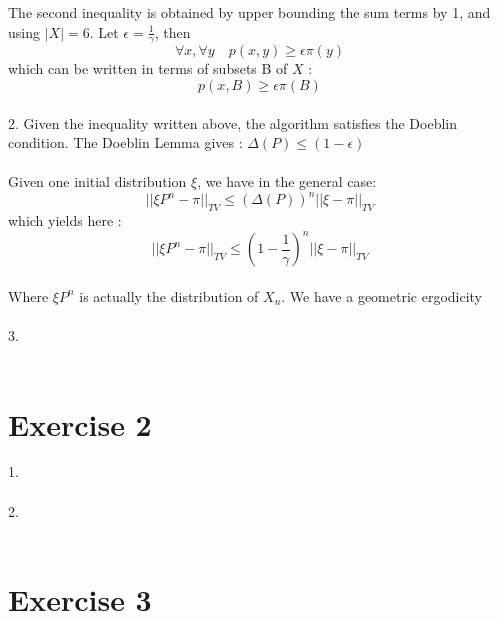 The second inequality is obtained by upper bounding the sum terms by 1, and using $|X|=6$.
Let $\boxed{\epsilon=\frac{1}{\gamma}}$, then
$$\forall x, \forall y \quad p(x,y) \geq \epsilon  \pi(y)$$
which can be written in terms of subsets B of $X$ :
$$\boxed{p(x,B) \geq \epsilon  \pi(B)}$$
~\\
2. Given the inequality written above, the algorithm satisfies the Doeblin condition. The Doeblin Lemma gives : $ \boxed{\Delta(P) \leq ( 1 - \epsilon )}$~\\
~\\
Given one initial distribution $\xi$, we have in the general case:
$$||\xi P^n - \pi||_{TV} \leq (\Delta(P))^{ n } ||\xi-\pi||_{TV}$$
which yields here :
$$ \boxed{||\xi P^n - \pi||_{TV} \leq (1-\frac{1}{\gamma})^{ n } ||\xi-\pi||_{TV}}$$~\\
Where $\xi P^n$ is actually the distribution of $X_n$. We have a geometric ergodicity~\\
~\\
3.~\\
~\\
\section*{Exercise 2}
1.~\\
~\\
2.~\\
~\\
\section*{Exercise 3}


